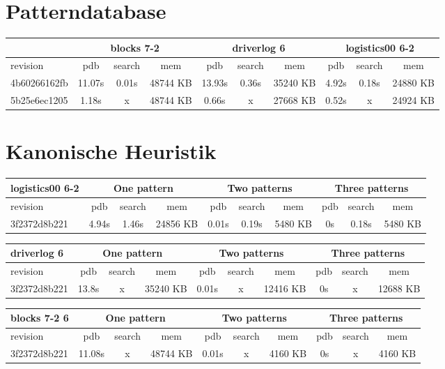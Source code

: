 \documentclass[a4paper,12pt]{scrartcl}
\begin{document}
\section{Patterndatabase}

\begin{tabular}{|l|c|c|c|c|c|c|c|c|c|}\hline
& \multicolumn{3}{c|}{blocks 7-2} & \multicolumn{3}{c|}{driverlog 6} & \multicolumn{3}{c|}{logistics00 6-2}\\\hline
revision & pdb & search & mem & pdb & search & mem & pdb & search & mem\\\hline
4b60266162fb & 11.07s & 0.01s & 48744 KB & 13.93s & 0.36s & 35240 KB & 4.92s & 0.18s & 24880 KB\\\hline
5b25e6ec1205 & 1.18s & x & 48744 KB & 0.66s & x & 27668 KB & 0.52s & x & 24924 KB\\\hline
\end{tabular}

\section{Kanonische Heuristik}

\begin{tabular}{|l|c|c|c|c|c|c|c|c|c|}\hline
logistics00 6-2 & \multicolumn{3}{c|}{One pattern} & \multicolumn{3}{c|}{Two patterns} & \multicolumn{3}{c|}{Three patterns}\\\hline
revision & pdb & search & mem & pdb & search & mem & pdb & search & mem\\\hline
3f2372d8b221 & 4.94s & 1.46s & 24856 KB & 0.01s & 0.19s & 5480 KB & 0s & 0.18s & 5480 KB\\\hline
\end{tabular}

\begin{tabular}{|l|c|c|c|c|c|c|c|c|c|}\hline
driverlog 6 & \multicolumn{3}{c|}{One pattern} & \multicolumn{3}{c|}{Two patterns} & \multicolumn{3}{c|}{Three patterns}\\\hline
revision & pdb & search & mem & pdb & search & mem & pdb & search & mem\\\hline
3f2372d8b221 & 13.8s & x & 35240 KB & 0.01s & x & 12416 KB & 0s & x & 12688 KB\\\hline
\end{tabular}

\begin{tabular}{|l|c|c|c|c|c|c|c|c|c|}\hline
blocks 7-2 6 & \multicolumn{3}{c|}{One pattern} & \multicolumn{3}{c|}{Two patterns} & \multicolumn{3}{c|}{Three patterns}\\\hline
revision & pdb & search & mem & pdb & search & mem & pdb & search & mem\\\hline
3f2372d8b221 & 11.08s & x & 48744 KB & 0.01s & x & 4160 KB & 0s & x & 4160 KB\\\hline
\end{tabular}
\end{document}
